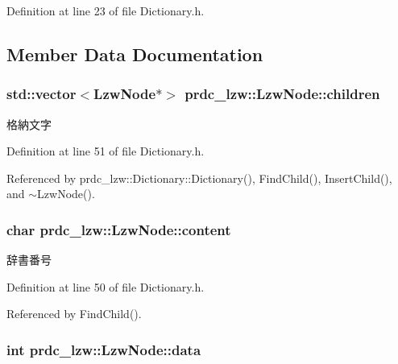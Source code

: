 Definition at line 23 of file Dictionary.\-h.



\subsection{Member Data Documentation}
\hypertarget{classprdc__lzw_1_1LzwNode_abc56c04f0b0f97baf8e2b3f08d736463}{
\subsubsection[{children}]{\setlength{\rightskip}{0pt plus 5cm}std\-::vector$<${\bf Lzw\-Node}$\ast$$>$ prdc\-\_\-lzw\-::\-Lzw\-Node\-::children\hspace{0.3cm}{\ttfamily [private]}}}\label{classprdc__lzw_1_1LzwNode_abc56c04f0b0f97baf8e2b3f08d736463}


格納文字 



Definition at line 51 of file Dictionary.\-h.



Referenced by prdc\-\_\-lzw\-::\-Dictionary\-::\-Dictionary(), Find\-Child(), Insert\-Child(), and $\sim$\-Lzw\-Node().

\hypertarget{classprdc__lzw_1_1LzwNode_acb2b7cb34053125cfdf7595aba9bc172}{
\subsubsection[{content}]{\setlength{\rightskip}{0pt plus 5cm}char prdc\-\_\-lzw\-::\-Lzw\-Node\-::content\hspace{0.3cm}{\ttfamily [private]}}}\label{classprdc__lzw_1_1LzwNode_acb2b7cb34053125cfdf7595aba9bc172}


辞書番号 



Definition at line 50 of file Dictionary.\-h.



Referenced by Find\-Child().

\hypertarget{classprdc__lzw_1_1LzwNode_ac85178681ea1181b22c3ac43af32515a}{
\subsubsection[{data}]{\setlength{\rightskip}{0pt plus 5cm}int prdc\-\_\-lzw\-::\-Lzw\-Node\-::data\hspace{0.3cm}{\ttfamily [private]}}}\label{classprdc__lzw_1_1LzwNode_ac85178681ea1181b22c3ac43af32515a}


